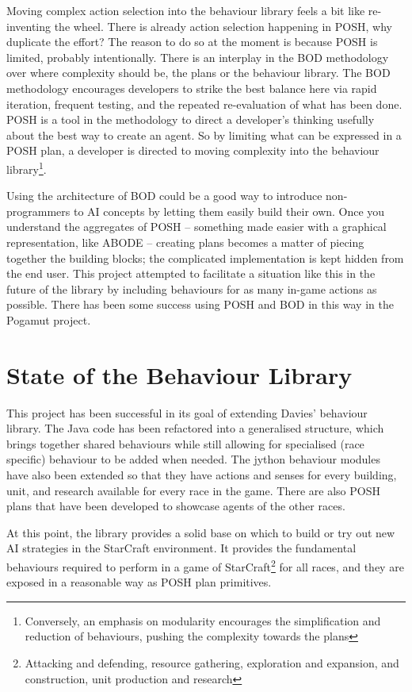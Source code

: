 \documentclass[11pt,openright,a4paper]{report}
\begin{document}
Moving complex action selection into the behaviour library feels a bit like re-inventing the wheel. There is already action selection happening in POSH, why duplicate the effort? The reason to do so at the moment is because POSH is limited, probably intentionally. There is an interplay in the BOD methodology over where complexity should be, the plans or the behaviour library. The BOD methodology encourages developers to strike the best balance here via rapid iteration, frequent testing, and the repeated re-evaluation of what has been done. POSH is a tool in the methodology to direct a developer's thinking usefully about the best way to create an agent. So by limiting what can be expressed in a POSH plan, a developer is directed to moving complexity into the behaviour library\footnote{Conversely, an emphasis on modularity encourages the simplification and reduction of behaviours, pushing the complexity towards the plans}.

Using the architecture of BOD could be a good way to introduce non-programmers to AI concepts by letting them easily build their own. Once you understand the aggregates of POSH -- something made easier with a graphical representation, like ABODE -- creating plans becomes a matter of piecing together the building blocks; the complicated implementation is kept hidden from the end user. This project attempted to facilitate a situation like this in the future of the library by including behaviours for as many in-game actions as possible. There has been some success using POSH and BOD in this way in the Pogamut project\cite{gemrot2009pogamut}.

\section{State of the Behaviour Library}
This project has been successful in its goal of extending Davies' behaviour library. The Java code has been refactored into a generalised structure, which brings together shared behaviours while still allowing for specialised (race specific) behaviour to be added when needed. The jython behaviour modules have also been extended so that they have actions and senses for every building, unit, and research available for every race in the game. There are also POSH plans that have been developed to showcase agents of the other races.

At this point, the library provides a solid base on which to build or try out new AI strategies in the StarCraft environment. It provides the fundamental behaviours required to perform in a game of StarCraft\footnote{Attacking and defending, resource gathering, exploration and expansion, and construction, unit production and research} for all races, and they are exposed in a reasonable way as POSH plan primitives.
\end{document}
